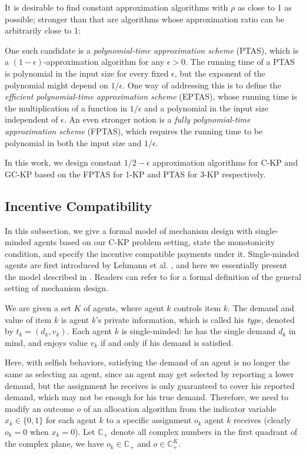 \documentclass{aamas2013}
\begin{document}
It is desirable to find constant approximation algorithms with $\rho$ as close to 1 as possible; stronger than that are algorithms whose approximation ratio can be arbitrarily close to 1: 

One such candidate is a {\em polynomial-time approximation scheme} (PTAS), which is a $(1-\epsilon)$-approximation algorithm for any $\epsilon>0$.  The running time of a PTAS is polynomial in the input size for every fixed $\epsilon$, but the exponent of the polynomial might depend on $1/\epsilon$.  One way of addressing this is to define the {\em efficient polynomial-time approximation scheme} (EPTAS), whose running time is the multiplication of a function in $1/\epsilon$ and a polynomial in the input size independent of $\epsilon$.
An even stronger notion is a {\em fully polynomial-time approximation scheme} (FPTAS), which requires the running time to be polynomial in both the input size and $1/\epsilon$.  

In this work, we design constant $1/2-\epsilon$ approximation algorithms for C-KP and GC-KP based on the FPTAS for 1-KP and PTAS for 3-KP respectively. 
\subsection{Incentive Compatibility}\label{subsec:ic}
\noindent
In this subsection, we give a formal model of mechanism design with single-minded agents based on our C-KP problem setting, state the monotonicity condition, and specify the incentive compatible payments under it.  Single-minded agents are first introduced by Lehmann et al. \cite{LOS99mono}, and here we essentially present the model described in \cite{BKV05KS}.  Readers can refer to \cite{N07book, NR01alg} for a formal definition of the general setting of mechanism design.

We are given a set $K$ of agents, where agent $k$ controls item $k$.  The demand and value of item $k$ is agent $k$'s private information, which is called his {\em type}, denoted by $t_k=(d_k, v_k)$.   Each agent $k$ is single-minded: he has the single demand $d_k$ in mind, and enjoys value $v_k$ if and only if his demand is satisfied.  

Here, with selfish behaviors, satisfying the demand of an agent is no longer the same as selecting an agent, since an agent may get selected by reporting a lower demand, but the assignment he receives is only guaranteed to cover his reported demand, which may not be enough for his true demand.  Therefore, we need to modify an outcome $o$ of an allocation algorithm from the indicator variable $x_k\in \{0,1\}$ for each agent $k$ to a specific assignment $o_k$ agent $k$ receives (clearly $o_k=0$ when $x_k=0$).  Let $\mathbb{C}_+$ denote all complex numbers in the first quadrant of the complex plane, we have $o_k\in \mathbb{C}_+$ and $o\in \mathbb{C}_+^{K}$.  
\end{document}
